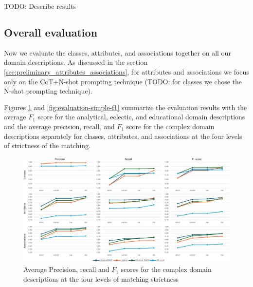 \noindent{}TODO: Describe results \\




\subsection{Overall evaluation}
\label{sec:overall_evaluation}

Now we evaluate the classes, attributes, and associations together on all our domain descriptions. As discussed in the section \ref{sec:preliminary_attributes_associations}, for attributes and associations we focus only on the CoT+N-shot prompting technique (TODO: for classes we chose the N-shot prompting technique).

Figures \ref{fig:evaluation-complex-p-r-f1} and \ref{fig:evaluation-simple-f1} summarize the evaluation results with the average $F_1$ score for the analytical, eclectic, and educational domain descriptions and the average precision, recall, and $F_1$ score for the complex domain descriptions separately for classes, attributes, and associations at the four levels of strictness of the matching.

\begin{figure}[!h]
    \centering
    \includegraphics[scale=0.10]{img/evaluation-complex-p-r-f1.png}
    \caption{\centering Average Precision, recall and $F_1$ scores for the complex domain descriptions at the four levels of matching strictness}
    \label{fig:evaluation-complex-p-r-f1}
\end{figure}

